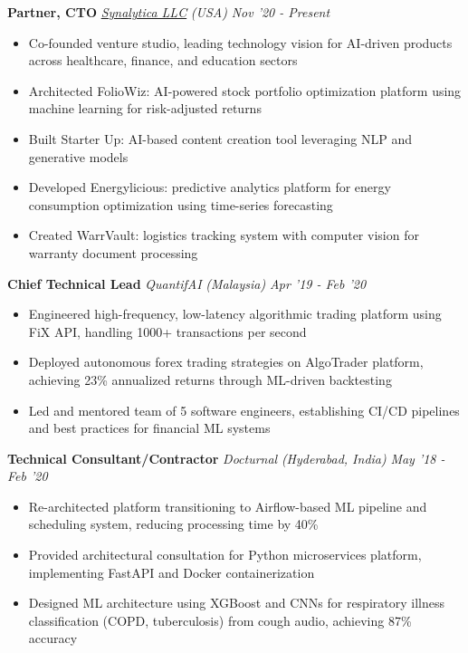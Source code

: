 \documentclass[10pt]{article}
\newenvironment{changemargin}[2]{%
  \begin{list}{}{%
    \setlength{\topsep}{0pt}%
    \setlength{\leftmargin}{#1}%
    \setlength{\rightmargin}{#2}%
    \setlength{\listparindent}{\parindent}%
    \setlength{\itemindent}{\parindent}%
    \setlength{\parsep}{\parskip}%
  }%
  \item[]}{\end{list}
}
\newenvironment{body} {
	\vspace*{-16pt}
	\begin{changemargin}{-0.6in}{-0.65in}
  }
	{\end{changemargin}
}
\begin{document}
\begin{body}
    \textbf{Partner, CTO} \href{https://synalytica.com}{\emph{Synalytica LLC}} \emph{(USA)} \hfill \emph{Nov '20 - Present}
    \begin{itemize}
        \item Co-founded venture studio, leading technology vision for AI-driven products across healthcare, finance, and education sectors
        \item Architected FolioWiz: AI-powered stock portfolio optimization platform using machine learning for risk-adjusted returns
        \item Built Starter Up: AI-based content creation tool leveraging NLP and generative models
        \item Developed Energylicious: predictive analytics platform for energy consumption optimization using time-series forecasting
        \item Created WarrVault: logistics tracking system with computer vision for warranty document processing
    \end{itemize}
    \smallskip{}

    \textbf{Chief Technical Lead} \emph{QuantifAI} \emph{(Malaysia)} \hfill \emph{Apr '19 - Feb '20}
    \begin{itemize}
        \item Engineered high-frequency, low-latency algorithmic trading platform using FiX API, handling 1000+ transactions per second
        \item Deployed autonomous forex trading strategies on AlgoTrader platform, achieving 23\% annualized returns through ML-driven backtesting
        \item Led and mentored team of 5 software engineers, establishing CI/CD pipelines and best practices for financial ML systems
    \end{itemize}
    \smallskip{}

    \textbf{Technical Consultant/Contractor} \emph{Docturnal} \emph{(Hyderabad, India)} \hfill \emph{May '18 - Feb '20}
    \begin{itemize}
        \item Re-architected platform transitioning to Airflow-based ML pipeline and scheduling system, reducing processing time by 40\%
        \item Provided architectural consultation for Python microservices platform, implementing FastAPI and Docker containerization
        \item Designed ML architecture using XGBoost and CNNs for respiratory illness classification (COPD, tuberculosis) from cough audio, achieving 87\% accuracy
    \end{itemize}
    \smallskip{}
\end{body}
\end{document}
